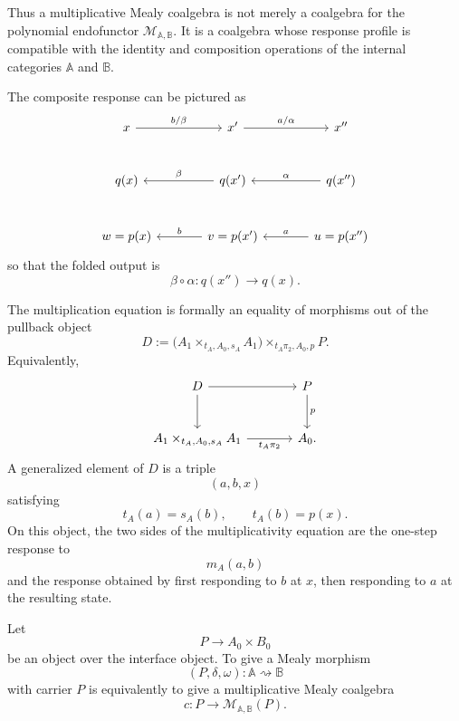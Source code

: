 Thus a multiplicative Mealy coalgebra is not merely a coalgebra for the
polynomial endofunctor \(\mathcal M_{\mathbb A,\mathbb B}\). It is a
coalgebra whose response profile is compatible with the identity and
composition operations of the internal categories \(\mathbb A\) and
\(\mathbb B\).

The composite response can be pictured as
\[
\begin{tikzcd}[column sep=large,row sep=large]
x
  \arrow[r, "{b/\beta}"]
&
x'
  \arrow[r, "{a/\alpha}"]
&
x''
\\
q(x)
&
q(x')
  \arrow[l, "\beta"']
&
q(x'')
  \arrow[l, "\alpha"']
\\
w=p(x)
&
v=p(x')
  \arrow[l, "b"']
&
u=p(x'')
  \arrow[l, "a"']
\end{tikzcd}
\]
so that the folded output is
\[
\beta\circ\alpha:q(x'')\to q(x).
\]

\begin{remark}
\label{rem:formal-reading-multiplicativity}
The multiplication equation is formally an equality of morphisms out of
the pullback object
\[
D
:=
\bigl(A_1\times_{t_A,A_0,s_A}A_1\bigr)
\times_{t_A\pi_2,A_0,p}
P.
\]
Equivalently,
\[
\begin{tikzcd}[column sep=large,row sep=large]
D
  \arrow[r]
  \arrow[d]
&
P
  \arrow[d, "p"]
\\
A_1\times_{t_A,A_0,s_A}A_1
  \arrow[r, "t_A\pi_2"']
&
A_0 .
\end{tikzcd}
\]
A generalized element of \(D\) is a triple
\[
(a,b,x)
\]
satisfying
\[
t_A(a)=s_A(b),
\qquad
t_A(b)=p(x).
\]
On this object, the two sides of the multiplicativity equation are the
one-step response to
\[
m_A(a,b)
\]
and the response obtained by first responding to \(b\) at \(x\), then
responding to \(a\) at the resulting state.
\end{remark}

\begin{theorem}
\label{thm:mealy-morphisms-multiplicative-coalgebras}
Let
\[
P\to A_0\times B_0
\]
be an object over the interface object. To give a Mealy morphism
\[
(P,\delta,\omega):\mathbb A\rightsquigarrow\mathbb B
\]
with carrier \(P\) is equivalently to give a multiplicative Mealy
coalgebra
\[
c:P\to\mathcal M_{\mathbb A,\mathbb B}(P).
\]
\end{theorem}

